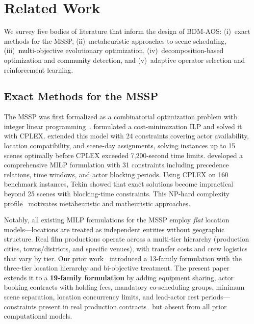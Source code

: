 \section{Related Work}
\label{sec:related}

We survey five bodies of literature that inform the design of BDM-AOS:
(i)~exact methods for the MSSP,
(ii)~metaheuristic approaches to scene scheduling,
(iii)~multi-objective evolutionary optimization,
(iv)~decomposition-based optimization and community detection, and
(v)~adaptive operator selection and reinforcement learning.

\subsection{Exact Methods for the MSSP}

The MSSP was first formalized as a combinatorial optimization problem with integer linear programming~\citep{bomsdorf2008, degraeve2007}.
\citet{zhen2014} formulated a cost-minimization ILP and solved it with CPLEX.
\citet{liu2019} extended this model with 24 constraints covering actor availability, location compatibility, and scene-day assignments, solving instances up to 15 scenes optimally before CPLEX exceeded 7{,}200-second time limits.
\citet{tekin2023} developed a comprehensive MILP formulation with 31 constraints including precedence relations, time windows, and actor blocking periods.
Using CPLEX on 160 benchmark instances, Tekin showed that exact solutions become impractical beyond 25 scenes with blocking-time constraints.
This NP-hard complexity profile~\citep{garey1979} motivates metaheuristic and matheuristic approaches.

Notably, all existing MILP formulations for the MSSP employ \emph{flat} location models---locations are treated as independent entities without geographic structure.
Real film productions operate across a multi-tier hierarchy (production cities, towns/districts, and specific venues), with transfer costs and crew logistics that vary by tier.
Our prior work~\citep{vjlaxmi2024} introduced a 13-family formulation with the three-tier location hierarchy and bi-objective treatment.
The present paper extends it to a \textbf{19-family formulation} by adding equipment sharing, actor booking contracts with holding fees, mandatory co-scheduling groups, minimum scene separation, location concurrency limits, and lead-actor rest periods---constraints present in real production contracts~\citep{bomsdorf2008} but absent from all prior computational models.


